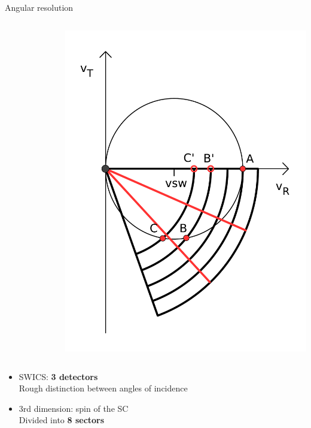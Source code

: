 \documentclass{beamer}
\begin{document}
\begin{frame}{Angular resolution}
\begin{columns}
\begin{figure}
		\end{figure}
		\column{4cm}
		\includegraphics[scale=0.22]{Pics/swics_collimator33.pdf}
	\end{columns}
	\begin{itemize}
	\item SWICS: \textbf{3 detectors} \\ \small{Rough distinction between angles of incidence}
	\item \normalsize{3rd dimension: spin of the SC} \\ \small{Divided into \textbf{8 sectors}}
\end{itemize}
\end{frame}
\end{document}
